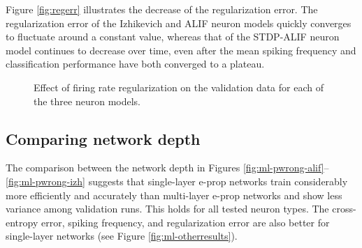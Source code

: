 			Figure \ref{fig:regerr} illustrates the decrease of the regularization error.
			The regularization error of the Izhikevich and ALIF neuron models quickly converges to fluctuate around a constant value, whereas that of the STDP-ALIF neuron model continues to decrease over time, even after the mean spiking frequency and classification performance have both converged to a plateau.

			\begin{figure}[bth]
			    \myfloatalign
			     \quad
			    \caption[Single-layer firing rate regularization per neuron model]{Effect of firing rate regularization on the validation data for each of the three neuron models.}\label{fig:sl-reg}
			\end{figure}

	\subsection{Comparing network depth}
		The comparison between the network depth in Figures \ref{fig:ml-pwrong-alif}--\ref{fig:ml-pwrong-izh} suggests that single-layer e-prop networks train considerably more efficiently and accurately than multi-layer e-prop networks and show less variance among validation runs.
		This holds for all tested neuron types.
		The cross-entropy error, spiking frequency, and regularization error are also better for single-layer networks (see Figure \ref{fig:ml-otherresults}).

